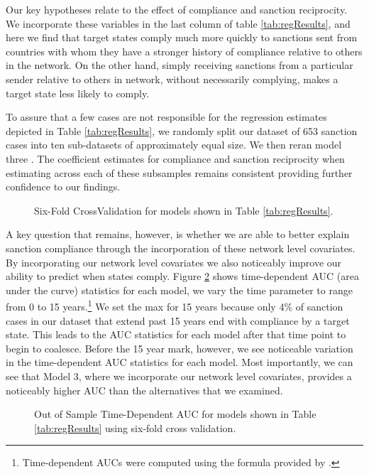 Our key hypotheses relate to the effect of compliance and sanction reciprocity. We incorporate these variables in the last column of table \ref{tab:regResults}, and here we find that target states comply much more quickly to sanctions sent from countries with whom they have a stronger history of compliance relative to others in the network. On the other hand, simply receiving sanctions from a particular sender relative to others in network, without necessarily complying, makes a target state less likely to comply. 

To assure that a few cases are not responsible for the regression estimates depicted in Table \ref{tab:regResults}, we randomly split our dataset of 653 sanction cases into ten sub-datasets of approximately equal size. We then reran model three . The coefficient estimates for compliance and sanction reciprocity when estimating across each of these subsamples remains consistent providing further confidence to our findings.

\begin{figure}[ht]
	\centering
	\caption{Six-Fold CrossValidation for models shown in Table \ref{tab:regResults}.}
	\resizebox{0.8\textwidth}{!}{}
	\label{fig:crossval}
\end{figure}
\FloatBarrier

A key question that remains, however, is whether we are able to better explain sanction compliance through the incorporation of these network level covariates. By incorporating our network level covariates we also noticeably improve our ability to predict when states comply. Figure \ref{fig:auc} shows time-dependent AUC (area under the curve) statistics for each model, we vary the time parameter to range from 0 to 15 years.\footnote{Time-dependent AUCs were computed using the formula provided by \citet{chambless2006estimation}.} We set the max for 15 years because only 4\% of sanction cases in our dataset that extend past 15 years end with compliance by a target state. This leads to the AUC statistics for each model after that time point to begin to coalesce. Before the 15 year mark, however, we see noticeable variation in the time-dependent AUC statistics for each model. Most importantly, we can see that Model 3, where we incorporate our network level covariates, provides a noticeably higher AUC than the alternatives that we examined.

\begin{figure}[ht]
	\centering
	\caption{Out of Sample Time-Dependent AUC for models shown in Table \ref{tab:regResults} using six-fold cross validation.}
	\resizebox{0.8\textwidth}{!}{}
	\label{fig:auc}
\end{figure}
\FloatBarrier

